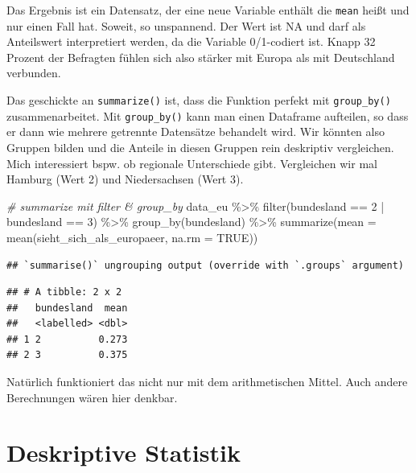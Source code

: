 \documentclass[
]{book}
\newenvironment{Shaded}{\begin{snugshade}}{\end{snugshade}}
\newcommand{\AttributeTok}[1]{\textcolor[rgb]{0.77,0.63,0.00}{#1}}
\newcommand{\CommentTok}[1]{\textcolor[rgb]{0.56,0.35,0.01}{\textit{#1}}}
\newcommand{\ConstantTok}[1]{\textcolor[rgb]{0.00,0.00,0.00}{#1}}
\newcommand{\DecValTok}[1]{\textcolor[rgb]{0.00,0.00,0.81}{#1}}
\newcommand{\FunctionTok}[1]{\textcolor[rgb]{0.00,0.00,0.00}{#1}}
\newcommand{\NormalTok}[1]{#1}
\newcommand{\SpecialCharTok}[1]{\textcolor[rgb]{0.00,0.00,0.00}{#1}}
\begin{document}
Das Ergebnis ist ein Datensatz, der eine neue Variable enthält die \texttt{mean} heißt und nur einen Fall hat. Soweit, so unspannend. Der Wert ist NA und darf als Anteilswert interpretiert werden, da die Variable 0/1-codiert ist. Knapp 32 Prozent der Befragten fühlen sich also stärker mit Europa als mit Deutschland verbunden.

Das geschickte an \texttt{summarize()} ist, dass die Funktion perfekt mit \texttt{group\_by()} zusammenarbeitet. Mit \texttt{group\_by()} kann man einen Dataframe aufteilen, so dass er dann wie mehrere getrennte Datensätze behandelt wird. Wir könnten also Gruppen bilden und die Anteile in diesen Gruppen rein deskriptiv vergleichen. Mich interessiert bspw. ob regionale Unterschiede gibt. Vergleichen wir mal Hamburg (Wert 2) und Niedersachsen (Wert 3).

\begin{Shaded}
\begin{Highlighting}[]
\CommentTok{\# summarize mit filter \& group\_by}
\NormalTok{data\_eu }\SpecialCharTok{\%\textgreater{}\%}
  \FunctionTok{filter}\NormalTok{(bundesland }\SpecialCharTok{==} \DecValTok{2} \SpecialCharTok{|}\NormalTok{ bundesland }\SpecialCharTok{==} \DecValTok{3}\NormalTok{) }\SpecialCharTok{\%\textgreater{}\%} 
  \FunctionTok{group\_by}\NormalTok{(bundesland) }\SpecialCharTok{\%\textgreater{}\%} 
  \FunctionTok{summarize}\NormalTok{(}\AttributeTok{mean =} \FunctionTok{mean}\NormalTok{(sieht\_sich\_als\_europaeer, }\AttributeTok{na.rm =} \ConstantTok{TRUE}\NormalTok{))}
\end{Highlighting}
\end{Shaded}

\begin{verbatim}
## `summarise()` ungrouping output (override with `.groups` argument)
\end{verbatim}

\begin{verbatim}
## # A tibble: 2 x 2
##   bundesland  mean
##   <labelled> <dbl>
## 1 2          0.273
## 2 3          0.375
\end{verbatim}

Natürlich funktioniert das nicht nur mit dem arithmetischen Mittel. Auch andere Berechnungen wären hier denkbar.

\hypertarget{deskriptive-statistik}{%
\chapter{Deskriptive Statistik}\label{deskriptive-statistik}}
\end{document}
